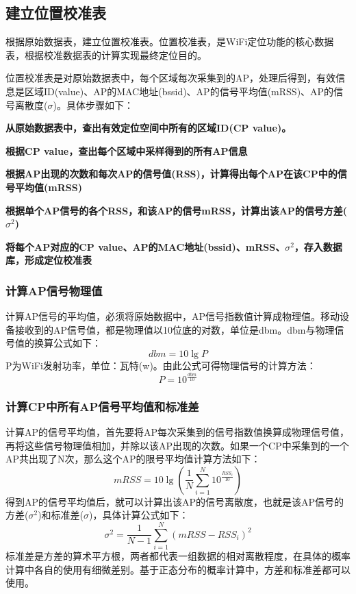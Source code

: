 \documentclass[UTF8, twocolumn ]{ctexart}
\begin{document}
\subsection{建立位置校准表}
根据原始数据表，建立位置校准表。位置校准表，是WiFi定位功能的核心数据表，根据校准数据表的计算实现最终定位目的。
\par
位置校准表是对原始数据表中，每个区域每次采集到的AP，处理后得到，有效信息是区域ID(value)、AP的MAC地址(bssid)、AP的信号平均值(mRSS)、AP的信号离散度($\sigma$)。具体步骤如下：
\begin{compactitem}
\item\textbf{从原始数据表中，查出有效定位空间中所有的区域ID(CP value)。}
\item\textbf{根据CP value，查出每个区域中采样得到的所有AP信息}
\item\textbf{根据AP出现的次数和每次AP的信号值(RSS)，计算得出每个AP在该CP中的信号平均值(mRSS)}
\item\textbf{根据单个AP信号的各个RSS，和该AP的信号mRSS，计算出该AP的信号方差($\sigma^{2}$)}
\item\textbf{将每个AP对应的CP value、AP的MAC地址(bssid)、mRSS、$\sigma^{2}$，存入数据库，形成定位校准表}
\end{compactitem}

\subsubsection{计算AP信号物理值}
计算AP信号的平均值，必须将原始数据中，AP信号指数值计算成物理值。移动设备接收到的AP信号值，都是物理值以10位底的对数，单位是dbm。dbm与物理信号值的换算公式如下：
\begin{equation}
  dbm=10\lg{P}
\end{equation}
P为WiFi发射功率，单位：瓦特(w)。由此公式可得物理信号的计算方法：
\begin{equation}
  P=10^{\frac{dbm}{10}}
\end{equation}

\subsubsection{计算CP中所有AP信号平均值和标准差}
计算AP的信号平均值，首先要将AP每次采集到的信号指数值换算成物理信号值，再将这些信号物理值相加，并除以该AP出现的次数。如果一个CP中采集到的一个AP共出现了N次，那么这个AP的限号平均值计算方法如下：
\begin{equation}
  mRSS=10\lg\left(\frac{1}{N}\sum^{N}_{i=1}10^{\frac{RSS_{i}}{10}}\right)
\end{equation}
得到AP的信号平均值后，就可以计算出该AP的信号离散度，也就是该AP信号的方差($\sigma^{2}$)和标准差($\sigma$)，具体计算公式如下：
\begin{equation}
  \sigma^{2}=\frac{1}{N-1}\sum^{N}_{i=1}\left(mRSS-RSS_{i}\right)^{2}
\end{equation}
标准差是方差的算术平方根，两者都代表一组数据的相对离散程度，在具体的概率计算中各自的使用有细微差别。基于正态分布的概率计算中，方差和标准差都可以使用。
\end{document}
